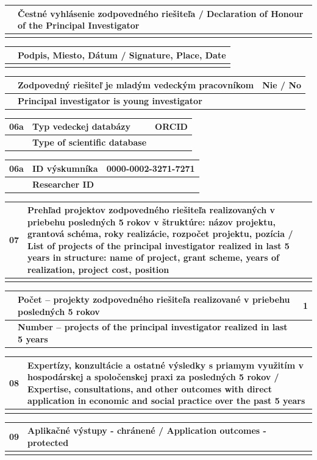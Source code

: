 \documentclass[9pt,a4paper]{extarticle}
\newcommand{\Field}[4]{\noindent\begin{tabularx}{\textwidth}{|>{\centering\arraybackslash}p{7mm}|>{\columncolor{shade}}p{59mm}|X|}\hline
\multirowdummy{#1} & \textbf{#2} & \multirowdummy{#4} \\ \cline{2-2}
& \textbf{#3} & \\ \hline\end{tabularx}\par\vspace{-1pt}}
\newcommand{\multirowdummy}[1]{#1}
\newcommand{\WideField}[4]{\noindent\begin{tabularx}{\textwidth}{|>{\columncolor{shade}}p{7mm}|>{\columncolor{shade}}X|}\hline
#1 & \textbf{#2} / #3 \\ \hline\multicolumn{2}{|p{\dimexpr\textwidth-2\tabcolsep-2\arrayrulewidth\relax}|}{#4}\\\hline\end{tabularx}\par\vspace{-1pt}}
\begin{document}
\WideField{}{Čestné vyhlásenie zodpovedného riešiteľa}{Declaration of Honour of the Principal Investigator}{Ja, dolu podpísaný/á, doc. Ing. Ján Lang, PhD., čestne vyhlasujem, že údaje uvedené v častiach „Základné informácie o zodpovednom riešiteľovi“ a v štruktúrovanom profesijnom životopise sú pravdivé.
 
Ja, dolu podpísaný/á, doc. Ing. Ján Lang, PhD., čestne vyhlasujem, že v rámci riešenia projektu budú zo strany žiadateľa rešpektované všetky zásady etických princípov vyplývajúce z európskej a národnej legislatívy.
 
Ja, dolu podpísaný/á, doc. Ing. Ján Lang, PhD., čestne vyhlasujem, že v rámci riešenia projektu budem postupovať v súlade s Národným kódexom výskumnej etiky a integrity.
 
I, the undersigned, doc. Ing. Ján Lang, PhD., declare that the information given in the “Basic information on the Principal Investigator” and in the Curriculum Vitae are true.
 
I, the undersigned, doc. Ing. Ján Lang, PhD., declare that during the project implementation all ethical principles arising from existing European and national legislations will be fully respected.
 
I, the undersigned, doc. Ing. Ján Lang, PhD., declare that during the project implementation, I will proceed in accordance with the National Code of Research Ethics and Integrity.}
\WideField{}{Podpis, Miesto, Dátum}{Signature, Place, Date}{}

\Field{05}{Zodpovedný riešiteľ je mladým vedeckým pracovníkom}{Principal investigator is young investigator}{Nie / No}
\Field{06a}{Typ vedeckej databázy}{Type of scientific database}{ORCID}
\Field{06a}{ID výskumníka}{Researcher ID}{0000-0002-3271-7271}
\WideField{07}{Prehľad projektov zodpovedného riešiteľa realizovaných v priebehu posledných 5 rokov v štruktúre: názov projektu, grantová schéma, roky realizácie, rozpočet projektu, pozícia}{List of projects of the principal investigator realized in last 5 years in structure: name of project, grant scheme, years of realization, project cost, position}{Vyvíjanie architektonických znalostí v edge–cloud kontinuu / Evolving Architectural Knowledge in the Edge-to-Cloud Continuum; APVV (APVV-23-0408); 2024–2028; 170 915 €; hlavný riešiteľ / principal investigator.}
\Field{07}{Počet -- projekty zodpovedného riešiteľa realizované v priebehu posledných 5 rokov}{Number -- projects of the principal investigator realized in last 5 years}{1}
\WideField{08}{Expertízy, konzultácie a ostatné výsledky s priamym využitím v hospodárskej a spoločenskej praxi za posledných 5 rokov}{Expertise, consultations, and other outcomes with direct application in economic and social practice over the past 5 years}{--}
\WideField{09}{Aplikačné výstupy - chránené}{Application outcomes - protected}{--}
\clearpage
\end{document}
